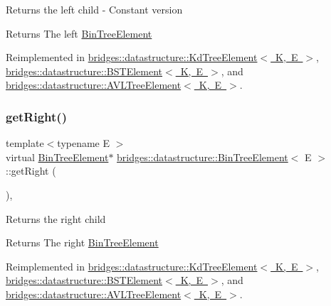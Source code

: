 Returns the left child -\/ Constant version \begin{DoxyReturn}{Returns}
The left \mbox{\hyperlink{classbridges_1_1datastructure_1_1_bin_tree_element}{Bin\+Tree\+Element}} 
\end{DoxyReturn}


Reimplemented in \mbox{\hyperlink{classbridges_1_1datastructure_1_1_kd_tree_element_a653597918fbc6e31b84fcf8dbdf67122}{bridges\+::datastructure\+::\+Kd\+Tree\+Element$<$ K, E $>$}}, \mbox{\hyperlink{classbridges_1_1datastructure_1_1_b_s_t_element_abac324ef0b480420bd82ecfe4501d60d}{bridges\+::datastructure\+::\+B\+S\+T\+Element$<$ K, E $>$}}, and \mbox{\hyperlink{classbridges_1_1datastructure_1_1_a_v_l_tree_element_a4a639e0c623435aadf5c51ed132cb25d}{bridges\+::datastructure\+::\+A\+V\+L\+Tree\+Element$<$ K, E $>$}}.

\mbox{\label{classbridges_1_1datastructure_1_1_bin_tree_element_ae1e6bde8cc03cf5da5a7930354fdf592}} 
\subsubsection{\texorpdfstring{getRight()}{getRight()}\hspace{0.1cm}{\footnotesize\ttfamily [1/2]}}
{\footnotesize\ttfamily template$<$typename E $>$ \\
virtual \mbox{\hyperlink{classbridges_1_1datastructure_1_1_bin_tree_element}{Bin\+Tree\+Element}}$\ast$ \mbox{\hyperlink{classbridges_1_1datastructure_1_1_bin_tree_element}{bridges\+::datastructure\+::\+Bin\+Tree\+Element}}$<$ E $>$\+::get\+Right (\begin{DoxyParamCaption}{ }\end{DoxyParamCaption})\hspace{0.3cm}{\ttfamily [inline]}, {\ttfamily [virtual]}}

Returns the right child \begin{DoxyReturn}{Returns}
The right \mbox{\hyperlink{classbridges_1_1datastructure_1_1_bin_tree_element}{Bin\+Tree\+Element}} 
\end{DoxyReturn}


Reimplemented in \mbox{\hyperlink{classbridges_1_1datastructure_1_1_kd_tree_element_a366e3b0987169220d3a145043be2373d}{bridges\+::datastructure\+::\+Kd\+Tree\+Element$<$ K, E $>$}}, \mbox{\hyperlink{classbridges_1_1datastructure_1_1_b_s_t_element_a80f5085d6d03805dd3091b7693d8e235}{bridges\+::datastructure\+::\+B\+S\+T\+Element$<$ K, E $>$}}, and \mbox{\hyperlink{classbridges_1_1datastructure_1_1_a_v_l_tree_element_aed585fdf56fcbfebac6cd0262c9c1807}{bridges\+::datastructure\+::\+A\+V\+L\+Tree\+Element$<$ K, E $>$}}.

